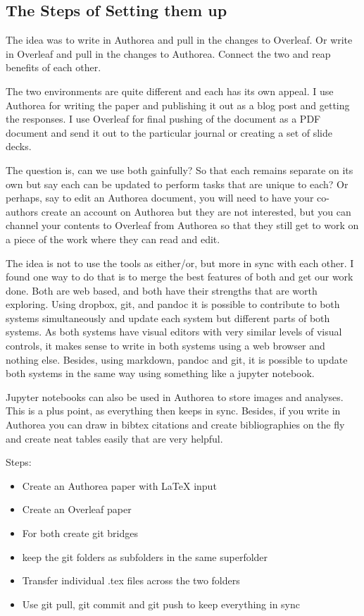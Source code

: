 \subsection{The Steps of Setting them up}

The idea was to write in Authorea and pull in the changes to Overleaf.
Or write in Overleaf and pull in the changes to Authorea. 
Connect the two and reap benefits of each other. 

The two environments are quite different and each has its own appeal. I use Authorea for writing the paper and publishing it out as a blog post and getting the responses. I use Overleaf for final pushing of the document as a PDF document and send it out to the particular journal or creating a set of slide decks. 

The question is, can we use both gainfully? So that each remains separate on its own but say each can be updated to perform tasks that are unique to each? Or perhaps, say to edit an Authorea document, you will need to have your co-authors create an account on Authorea but they are not interested, but you can channel your contents to Overleaf from Authorea so that they still get to work on a piece of the work where they can read and edit. 

The idea is not to use the tools as either/or, but more in sync with each other. I found one way to do that is to merge the best features of both and get our work done. Both are web based, and both have their strengths that are worth exploring. Using dropbox, git, and pandoc it is possible to contribute to both systems simultaneously and update each system but different parts of both systems. As both systems have visual editors with very similar levels of visual controls, it makes sense to write in both systems using a web browser and nothing else. Besides, using markdown, pandoc and git, it is possible to update both systems in the same way using something like a jupyter notebook. 

Jupyter notebooks can also be used in Authorea to store images and analyses. This is a plus point, as everything then keeps in sync. Besides, if you write in Authorea you can draw in bibtex citations and create bibliographies on the fly and create neat tables easily that are very helpful. 

Steps:
\begin{itemize}
\item Create an Authorea paper with LaTeX input
\item Create an Overleaf paper 
\item For both create git bridges
\item keep the git folders as subfolders in the same superfolder
\item Transfer individual .tex files across the two folders
\item Use git pull, git commit  and git push to keep everything in sync
\end{itemize}


